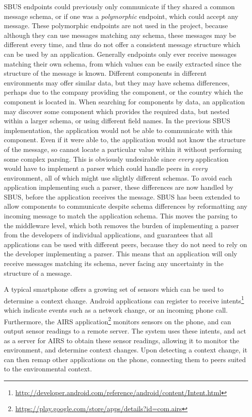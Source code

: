\documentclass[12pt,twoside,notitlepage]{report}
\begin{document}
SBUS endpoints could previously only communicate if they shared a common message schema, or if one was a {\sl polymorphic} endpoint, which could accept any message. 
These polymorphic endpoints are not used in the project, because although they can use messages matching any schema, these messages may be different every time, and thus do not offer a consistent message structure which can be used by an application. 
Generally endpoints only ever receive messages matching their own schema, from which values can be easily extracted since the structure of the message is known. 
Different components in different environments may offer similar data, but they may have schema differences, perhaps due to the company providing the component, or the country which the component is located in. 
When searching for components by data, an application may discover some component which provides the required data, but nested within a larger schema, or using different field names. 
In the previous SBUS implementation, the application would not be able to communicate with this component. 
Even if it were able to, the application would not know the structure of the message, so cannot locate a particular value within it without performing some complex parsing. 
This is obviously undesirable since {\sl every} application would have to implement a parser which could handle peers in {\sl every} environment, all of which might use slightly different schemas.
To avoid each application implementing such a parser, these differences are now handled by SBUS, before the application receives the message. 
SBUS has been extended to allow components to communicate despite schema differences by reformatting any incoming message to match the application schema. 
This moves the parsing to the middleware level, which both removes the burden of implementing a parser from the developers of individual applications, and guarantees that all applications can be used with different peers, because they do not need to rely on the developer implementing a parser. 
This means that an application will only receive messages matching its schema, never facing any uncertainty in the structure of a message. 

A typical smartphone offers a growing set of sensors \cite{lane2010survey} which can be used to determine a context change. 
Android applications can register to receive intents\footnote{\url{http://developer.android.com/reference/android/content/Intent.html}} which indicate events such as a network change, or an incoming phone call. 
Furthermore, the AIRS application\footnote{\url{https://play.google.com/store/apps/details?id=com.airs}} monitors sensors on the phone, and can output sensor readings to a remote server.
The system uses these intents, and act as a server for AIRS to obtain these sensor readings, allowing it to monitor the environment, and determine context changes. 
Upon detecting a context change, it can then remap other applications on the phone, connecting them to peers suited to the environmental context. 
\end{document}
